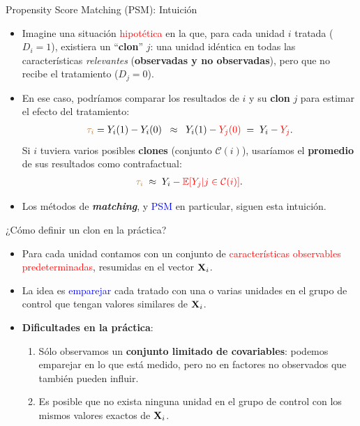 \documentclass[10pt, xcolor=dvipsnames]{beamer}
\begin{document}
\begin{frame}{Propensity Score Matching (PSM): Intuición}
\begin{itemize}
    \item Imagine una situación \textcolor{red}{hipotética} en la que, para cada unidad $i$ tratada (\(D_i=1\)), existiera un ``\textbf{clon}'' $j$: una unidad idéntica en todas las características \textit{relevantes} (\textbf{observadas y no observadas}), pero que no recibe el tratamiento (\(D_j=0\)).
    \vspace{0.5em}
    \item En ese caso, podríamos comparar los resultados de $i$ y su \textbf{clon} $j$ para estimar el efecto del tratamiento:
    \vspace{-0.25em}
    \begin{align*}
        \textcolor{brown}{\tau_i} = Y_i(1) - Y_i(0) \;\;\approx\;\; Y_i(1) - \textcolor{red}{Y_j(0)} \;=\; Y_i - \textcolor{red}{Y_j}.
    \end{align*}
    Si $i$ tuviera varios posibles \textbf{clones} (conjunto \(\mathcal{C}(i)\)), usaríamos el \textbf{promedio} de sus resultados como contrafactual:
    \vspace{-0.5em}
    \begin{align*}
        \textcolor{brown}{\tau_i} \;\approx\; Y_i - \textcolor{red}{\operatorname{\mathbb{E}}[Y_j | j \in \mathcal{C}(i)]}.
    \end{align*}
    \item Los métodos de \textbf{\textit{matching}}, y \textcolor{blue}{PSM} en particular, siguen esta intuición.
\end{itemize}
\end{frame}


\begin{frame}{¿Cómo definir un clon en la práctica?}
\begin{itemize}
    \item Para cada unidad contamos con un conjunto de \textcolor{red}{características observables predeterminadas}, resumidas en el vector \(\textbf{X}_i\).
    \vspace{0.5em}
    \item La idea es \textcolor{blue}{emparejar} cada tratado con una o varias unidades en el grupo de control que tengan valores similares de \(\textbf{X}_i\). 
    \vspace{1em}
    \item \textbf{Dificultades en la práctica}:
    \smallspace
    \begin{enumerate}
        \item Sólo observamos un \textbf{conjunto limitado de covariables}: podemos emparejar en lo que está medido, pero no en factores no observados que también pueden influir. %
        \smallspace
        \item Es posible que no exista ninguna unidad en el grupo de control con los mismos valores exactos de \(\textbf{X}_i\).
    \end{enumerate}
\end{itemize}
\end{frame}
\end{document}

